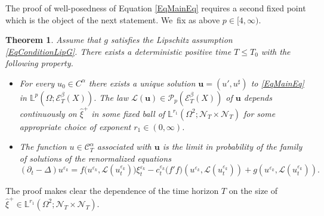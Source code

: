 \documentclass[10pt]{amsart}
\newtheorem{thm}{Theorem}
\theoremstyle{definition}
\let\epsilon\varepsilon
\newcommand{\mcE}{\mathcal{E}}
\newcommand{\mcL}{\mathcal{L}}
\newcommand{\mcN}{\mathcal{N}}
\newcommand{\mcP}{\mathcal{P}}
\newcommand{\bbL}{\mathbb{L}}
\newcommand{\bsu}{\boldsymbol{u}}
\newcommand{\scrC}{\ensuremath{\mathscr{C}}}
\begin{document}
The proof of well-posedness of Equation \eqref{EqMainEq} requires a second fixed point which is the object of the next statement. We~fix as above $p\in[4,\infty)$.


\begin{thm} \label{SolMcKeanSingular}
Assume that $g$ satisfies the Lipschitz assumption \eqref{EqConditionLipG}. There exists a deterministic positive time $T\leq T_0$ with the following property.
\begin{itemize}
\item
For every $u_0\in C^\alpha$ there exists a unique solution $\bsu=(u',u^\sharp)$ to \eqref{EqMainEq} in $\bbL^p(\Omega; \mcE^\beta_T (X))$. The law $\mcL(\bsu) \in \mcP_p(\mcE^\beta_T (X))$ of $\bsu$ depends continuously on $\widehat\xi^+$ in some fixed ball of $\bbL^{r_1}(\Omega^2; {{\boldsymbol{\mcN}}_T}\times{{\boldsymbol{\mcN}}_T})$ for some appropriate choice of exponent $r_1\in(0,\infty)$. 

\item
The function $u\in\scrC^\alpha_T$ associated with $\bsu$ is the limit in probability of the family of solutions of the renormalized equations
\[
(\partial_t - \Delta)u^{\epsilon_k} = f\bigl(u^{\epsilon_k}, \mcL(u^{\epsilon_k}_t)\bigr) \xi^{\epsilon_k}_t - c^{\epsilon_k}_t \bigl(f'f\bigr)(u^{\epsilon_k}, \mcL(u^{\epsilon_k}_t)) + g(u^{\epsilon_k},\mcL(u^{\epsilon_k}_t)).
\]
\end{itemize}
\end{thm}


The proof makes clear the dependence of the time horizon $T$ on the size of $\widehat\xi^+\in\bbL^{r_1}(\Omega^2; {{\boldsymbol{\mcN}}_T}\times{{\boldsymbol{\mcN}}_T})$.
\end{document}
